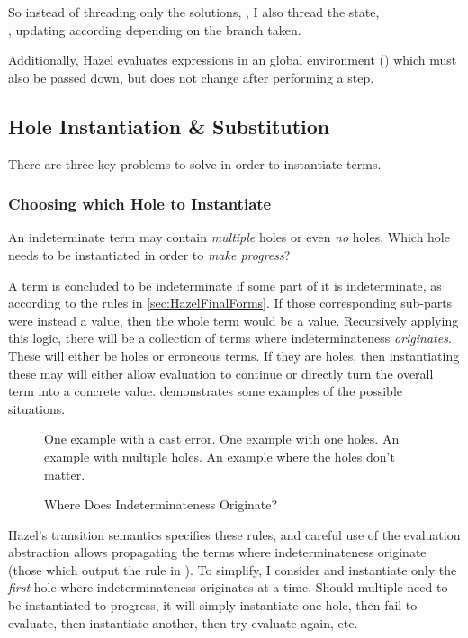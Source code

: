 So instead of threading only the solutions, , I also thread the state, \\, updating according depending on the branch taken.

Additionally, Hazel evaluates expressions in an global environment () which must also be passed down, but does not change after performing a step.

\subsection{Hole Instantiation \& Substitution}\label{sec:HoleInstantiation}
There are three key problems to solve in order to instantiate terms.

\subsubsection{Choosing which Hole to Instantiate}
\label{sec:ChooseHole}
An indeterminate term may contain \textit{multiple} holes or even \textit{no} holes. Which hole needs to be instantiated in order to \textit{make progress}?

A term is concluded to be indeterminate if some part of it is indeterminate, as according to the rules in \ref{sec:HazelFinalForms}. If those corresponding sub-parts were instead a value, then the whole term would be a value. Recursively applying this logic, there will be a collection of terms where indeterminateness \textit{originates}. These will either be holes or erroneous terms. If they are holes, then instantiating these may will either allow evaluation to continue or directly turn the overall term into a concrete value.  demonstrates some examples of the possible situations.

\begin{figure}
One example with a cast error. One example with one holes. An example with multiple holes. An example where the holes don't matter.
\caption{Where Does Indeterminateness Originate?}
\label{fig:IndetOrigination}
\end{figure}

Hazel's transition semantics specifies these rules, and careful use of the evaluation abstraction allows propagating the terms where indeterminateness originate (those which output the rule  in ). To simplify, I consider and instantiate only the \textit{first} hole where indeterminateness originates at a time. Should multiple need to be instantiated to progress, it will simply instantiate one hole, then fail to evaluate, then instantiate another, then try evaluate again, etc.

